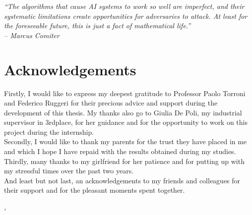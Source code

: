
\cleardoublepage
{}
{}
\begin{flushright}{
	\slshape
	“The algorithms
	that cause AI systems
	to work so well are
	imperfect, and their
	systematic limitations
	create opportunities for
	adversaries to attack. At
	least for the foreseeable
	future, this is just a fact of
	mathematical life.”
	\\ – Marcus Comiter} \\


	\medskip

\end{flushright}



\begingroup
\let\clearpage\relax
\let\cleardoublepage\relax
\let\cleardoublepage\relax

\chapter*{Acknowledgements}

\noindent Firstly, I would like to express my deepest gratitude to Professor Paolo Torroni and Federico Ruggeri 
for their precious advice and support during the development of this thesis.
My thanks also go to Giulia De Poli, my industrial supervisor in 3rdplace, for her guidance and for the opportunity to work on this project during the internship.
\\

\noindent Secondly, I would like to thank my parents for the trust they have placed in me and which I hope I have repaid with the results obtained during my studies.
\\

\noindent Thirdly, many thanks to my girlfriend for her patience and for putting up with my stressful times over the past two years.
\\

\noindent And least but not last, an acknowledgements to my friends and colleagues for their support and for the pleasant moments spent together.
\\

\vspace{2cm}

\noindent\textit{\myLocation, \myTime}
\hfill \myName

\endgroup

